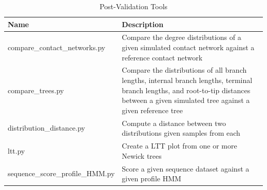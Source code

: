 \begin{table}[!ht] %
\caption[Post-Validation Tools]{Post-Validation Tools}
\vspace{-0.25in}
\begin{center}
\begin{tabular}{|P{2.3in}|P{3.7in}|}
\hline
\textbf{Name} & \textbf{Description}  \\
\hline
compare\_contact\_networks.py & Compare the degree distributions of a given simulated contact network against a reference contact network \\
\hline
compare\_trees.py & Compare the distributions of all branch lengths, internal branch lengths, terminal branch lengths, and root-to-tip distances between a given simulated tree against a given reference tree \\
\hline
distribution\_distance.py & Compute a distance between two distributions given samples from each \\
\hline
ltt.py & Create a \gls{LTT} plot from one or more Newick trees \\
\hline
sequence\_score\_profile\_HMM.py & Score a given sequence dataset against a given profile \gls{HMM} \\
\hline
\end{tabular}
\end{center}
\label{tab:favites-post-validation}
\end{table}

